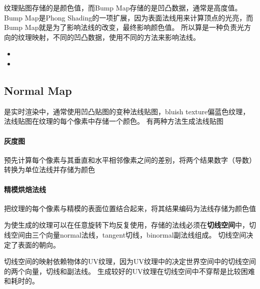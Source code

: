 纹理贴图存储的是颜色值，而Bump Map存储的是凹凸数据，通常是高度值。
Bump Map是Phong Shading的一项扩展，因为表面法线用来计算顶点的光亮，而Bump Map就是为了影响法线的改变，最终影响颜色值。
所以算是一种负责光方向的纹理映射，不同的凹凸数据，使用不同的方法来影响法线。

\begin{itemize}
    \item {}
    \item {}
\end{itemize}

\subsection{Normal Map}

是实时渲染中，通常使用凹凸贴图的变种法线贴图，bluish texture偏蓝色纹理，法线贴图在纹理的每个像素中存储一个颜色。
有两种方法生成法线贴图
\paragraph{灰度图}
预先计算每个像素与其垂直和水平相邻像素之间的差别，将两个结果数字（导数）转换为单位法线并存储为颜色
\paragraph{精模烘焙法线}
把纹理的每个像素与精模的表面位置结合起来，将其结果编码为法线存储为颜色值

为使生成的纹理可以在任意旋转下均反复使用，存储的法线必须在\textbf{切线空间}中，切线空间由三个向量normal法线，tangent切线，binormal副法线组成。
切线空间决定了表面的朝向。

切线空间的映射依赖物体的UV纹理，因为UV纹理中的决定世界空间中的切线空间的两个向量，切线和副法线。
生成较好的UV纹理在切线空间中不穿帮是比较困难和耗时的。

